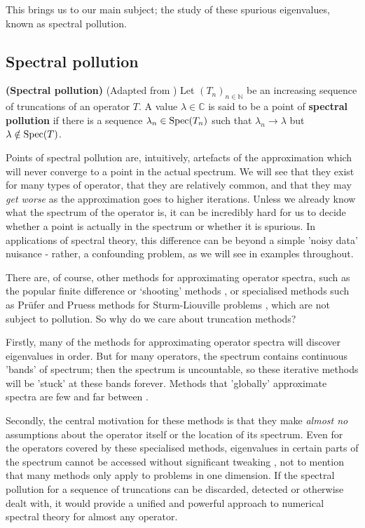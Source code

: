 \documentclass[../main.tex]{subfiles}
\begin{document}
This brings us to our main subject; the study of these spurious eigenvalues, known as spectral pollution.

\subsection{Spectral pollution}

\begin{definition}{\textbf{(Spectral pollution)}}
(Adapted from \parencite{davies1995spectral})
Let $(T_n)_{n \in \mathbb{N}}$ be an increasing sequence of truncations of an
operator $T$. A value $\lambda \in \mathbb{C}$ is said to be a point of
\textbf{spectral pollution} if there is a sequence $\lambda_n \in \mathrm{Spec}(T_n)$
such that $\lambda_n \rightarrow \lambda$ but $\lambda \notin \mathrm{Spec}(T)$.
\end{definition}

Points of spectral pollution are, intuitively, artefacts of the approximation
which will never converge to a point in the actual spectrum. We will see that
they exist for many types of operator, 
that they are relatively common, and that they may \emph{get worse} as
the approximation goes to higher iterations. Unless we already know what the
spectrum of the operator is, it can be incredibly hard for us to decide whether
a point is actually in the spectrum or whether it is
spurious. In applications of spectral theory, this difference can be beyond a
simple 'noisy data' nuisance - rather, a confounding problem, as we will see
in examples throughout.

There are, of course, other methods for approximating operator spectra, such as
the popular finite difference or `shooting' methods \cite{suli2003introduction},
or specialised methods such as Pr\"ufer and Pruess methods for Sturm-Liouville
problems \cite{pryce1993numerical}, which are not subject to pollution. So why
do we care about truncation methods?

Firstly, many of the methods for approximating operator spectra will discover eigenvalues
in order. But for many operators, the spectrum contains continuous 'bands' of spectrum;
then the spectrum is uncountable, so these iterative methods will be 'stuck' at these
bands forever. Methods that 'globally' approximate spectra are few and far between
\cite{pryce1993numerical}.

Secondly, the central motivation for these methods is that they make \emph{almost no}
assumptions about the operator itself or the location of its spectrum. Even for
the operators covered by these specialised methods, eigenvalues in certain parts
of the spectrum cannot be accessed without significant tweaking
\cite{aceto2006numerical}, not to mention that many methods only apply to
problems in one dimension. If the spectral pollution for a sequence of
truncations can be discarded, detected or otherwise dealt with, it would provide
a unified and powerful approach to numerical spectral theory for almost any operator.
\end{document}
